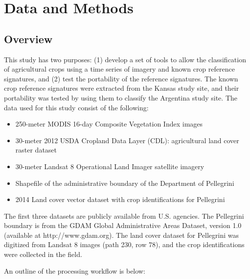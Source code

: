 \chapter{Data and Methods}
\label{chapter:methods}

\section{Overview}

This study has two purposes: (1) develop a set of tools to allow the classification of agricultural crops using a time series of imagery and known crop reference signatures, and (2) test the portability of the reference signatures. The known crop reference signatures were extracted from the Kansas study site, and their portability was tested by using them to classify the Argentina study site. The data used for this study consist of the following:

\begin{Spacing}{1.2}
\begin{itemize}
  \item 250-meter MODIS 16-day Composite Vegetation Index images
  \item 30-meter 2012 USDA Cropland Data Layer (CDL): agricultural land cover raster dataset
  \item 30-meter Landsat 8 Operational Land Imager satellite imagery
  \item Shapefile of the administrative boundary of the Department of Pellegrini
  \item 2014 Land cover vector dataset with crop identifications for Pellegrini
\end{itemize}
\end{Spacing}

The first three datasets are publicly available from U.S. agencies. The Pellegrini boundary is from the GDAM Global Administrative Areas Dataset, version 1.0 (available at http://www.gdam.org). The land cover dataset for Pellegrini was digitized from Landsat 8 images (path 230, row 78), and the crop identifications were collected in the field.

An outline of the processing workflow is below:

